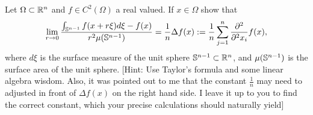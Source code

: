 \documentclass[../main.tex]{subfiles}
\begin{document}
\begin{problem}
Let $\Omega \subset \Bbb R^n$ and $f \in C^2(\Omega)$ a real valued. If $x \in \Omega$ show that
$$\lim_{r \to 0} \frac{\int_{\Bbb S^{n-1}} f(x + r \xi) d\xi - f(x)}{ r^2\mu(\Bbb S^{n-1})} = \frac{1}{n}\Delta f(x):= \frac{1}{n}\sum_{j=1}^n \frac{\partial^2}{\partial^2 x_i} f(x) ,$$
where $d\xi$ is the surface measure of the unit sphere $\Bbb S^{n-1} \subset \Bbb R^n$, and $\mu(\Bbb S^{n-1})$ is the surface area of the unit sphere. [Hint: Use Taylor's formula and some linear algebra wisdom. Also, it was pointed out to me that the constant $\frac{1}{n}$ may need to adjusted in front of $\Delta f(x)$ on the right hand side. I leave it up to you to find the correct constant, which your precise calculations should naturally yield]
\end{problem}
\end{document}
